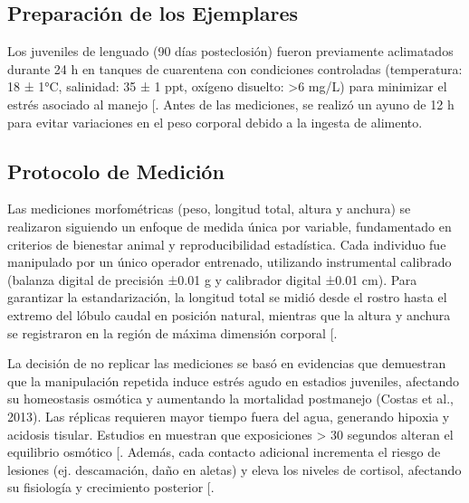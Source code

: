 \documentclass[a4paper,10pt,spanish]{jupyterBook}
\begin{document}
\subsection{Preparación de los Ejemplares}
\label{\detokenize{content/02/Dataset:preparacion-de-los-ejemplares}}
\sphinxAtStartPar
Los juveniles de lenguado (90 días post\sphinxhyphen{}eclosión) fueron previamente aclimatados durante 24 h en tanques de cuarentena con condiciones controladas (temperatura: 18 ± 1°C, salinidad: 35 ± 1 ppt, oxígeno disuelto: >6 mg/L) para minimizar el estrés asociado al manejo {[}\sphinxhref{https://link.springer.com/article/10.1007/s10695-011-9518-8}{Martins et al., 2012}{]}. Antes de las mediciones, se realizó un ayuno de 12 h para evitar variaciones en el peso corporal debido a la ingesta de alimento.


\subsection{Protocolo de Medición}
\label{\detokenize{content/02/Dataset:protocolo-de-medicion}}
\sphinxAtStartPar
Las mediciones morfométricas (peso, longitud total, altura y anchura) se realizaron siguiendo un enfoque de medida única por variable, fundamentado en criterios de bienestar animal y reproducibilidad estadística. Cada individuo fue manipulado por un único operador entrenado, utilizando instrumental calibrado (balanza digital de precisión ±0.01 g y calibrador digital ±0.01 cm). Para garantizar la estandarización, la longitud total se midió desde el rostro hasta el extremo del lóbulo caudal en posición natural, mientras que la altura y anchura se registraron en la región de máxima dimensión corporal {[}\sphinxhref{https://www.researchgate.net/publication/282421080\_Advanced\_Techniques\_for\_Morphometric\_Analysis\_in\_Fish}{Tonna 2015}{]}.

\sphinxAtStartPar
La decisión de no replicar las mediciones se basó en evidencias que demuestran que la manipulación repetida induce estrés agudo en estadios juveniles, afectando su homeostasis osmótica y aumentando la mortalidad post\sphinxhyphen{}manejo (Costas et al., 2013). Las réplicas requieren mayor tiempo fuera del agua, generando hipoxia y acidosis tisular. Estudios en  muestran que exposiciones > 30 segundos alteran el equilibrio osmótico {[}\sphinxhref{https://doi.org/10.1016/j.aquaculture.2011.03.011}{Costas et al., 2013}{]}. Además, cada contacto adicional incrementa el riesgo de lesiones (ej. descamación, daño en aletas) y eleva los niveles de cortisol, afectando su fisiología y crecimiento posterior {[}\sphinxhref{https://doi.org/10.1016/j.applanim.2004.02.003}{Conte, 2004}{]}.
\end{document}
